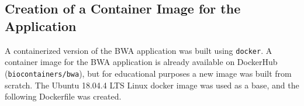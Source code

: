 \documentclass{article}
\begin{document}
\subsection{Creation of a Container Image for the Application}
A containerized version of the BWA application was built using \texttt{docker}.
A container image for the BWA application is already available on DockerHub (\texttt{biocontainers/bwa}), but for educational purposes a new image was built from scratch.
The Ubuntu 18.04.4 LTS Linux docker image was used as a base, and the following Dockerfile was created.

\begin{lstlistings}

\end{lstlistings}
\end{document}

